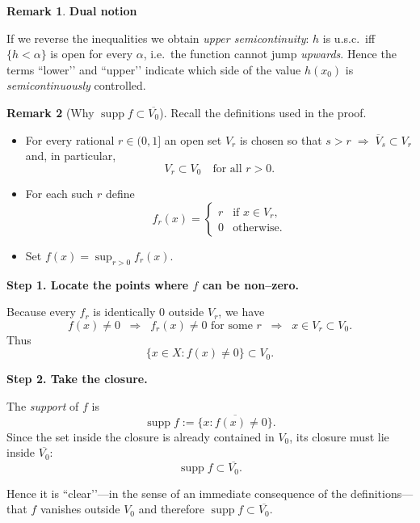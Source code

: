 \documentclass[12pt]{article}
\theoremstyle{definition} %
\newtheorem{remark}{Remark}
\theoremstyle{plain} %
\begin{document}
\begin{remark}
        \bigskip
        \textbf{Dual notion}
        
        If we reverse the inequalities we obtain \emph{upper semicontinuity}:
        $h$ is u.s.c.\ iff $\{h<\alpha\}$ is open for every $\alpha$, i.e.\ the
        function cannot jump \emph{upwards}.  Hence the terms “lower’’ and
        “upper’’ indicate which side of the value $h(x_{0})$ is
        \emph{semicontinuously} controlled.
        \end{remark}
        \pagebreak
        \begin{remark}[Why $\operatorname{supp}f\subset\overline{V_{0}}$]
          Recall the definitions used in the proof.
          
          \begin{itemize}
              \item For every rational $r\in(0,1]$ an open set $V_{r}$ is chosen so that  
                    $s>r\;\Longrightarrow\;\overline{V}_{s}\subset V_{r}$ and, in particular,
                    \[
                        V_{r}\subset V_{0}\quad\text{for all }r>0.
                    \]
          
              \item For each such $r$ define
                    \[
                       f_{r}(x)=
                       \begin{cases}
                          r & \text{if }x\in V_{r},\\[4pt]
                          0 & \text{otherwise.}
                       \end{cases}
                    \]
              \item Set $f(x)=\displaystyle\sup_{r>0}f_{r}(x)$.
          \end{itemize}
          
          \medskip
          \noindent
          \textbf{Step 1.  Locate the points where $f$ can be non–zero.}
          
          Because every $f_{r}$ is identically $0$ outside $V_{r}$, we have
          \[
             f(x)\neq 0
             \;\;\Longrightarrow\;\;
             f_{r}(x)\neq 0\text{ for some }r
             \;\;\Longrightarrow\;\;
             x\in V_{r}\subset V_{0}.
          \]
          Thus
          \[
             \bigl\{x\in X:f(x)\neq 0\bigr\}\subset V_{0}.
          \]
          
          \medskip
          \noindent
          \textbf{Step 2.  Take the closure.}
          
          The \emph{support} of $f$ is
          \[
             \operatorname{supp}f
             :=\overline{\{x:f(x)\neq 0\}}.
          \]
          Since the set inside the closure is already contained in $V_{0}$, its
          closure must lie inside $\overline{V_{0}}$:
          \[
             \operatorname{supp}f
             \subset \overline{V_{0}}.
          \]
          
          \bigskip
          \noindent
          Hence it is “clear’’—in the sense of an immediate consequence of the
          definitions—that $f$ vanishes outside $V_{0}$ and therefore
          $\operatorname{supp}f\subset\overline{V_{0}}$.
          \end{remark}
\end{document}
